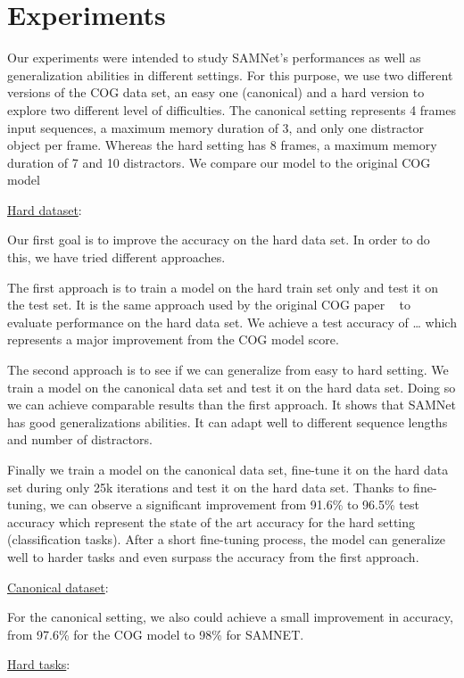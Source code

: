 \section{Experiments}

Our experiments were intended to study SAMNet's performances as well as generalization abilities in different settings. For this purpose, we use two different versions of the COG data set, an easy one (canonical) and a hard version to explore two different level of difficulties. The canonical setting represents 4 frames input sequences, a maximum memory duration of 3, and only one distractor object per frame. Whereas the hard setting has 8 frames, a maximum memory duration of 7 and 10 distractors. We compare our model to the original COG model~\cite{cog2018}

\underline {Hard dataset}:

Our first goal is to improve the accuracy on the hard data set. In order to do this, we have tried different approaches.

The first approach is to train a model on the hard train set only and test it on the test set. It is the same approach used by the original COG paper ~\cite{cog2018} to evaluate performance on the hard data set. We achieve a test accuracy of … which represents a major improvement from the COG model score.

The second approach is to see if we can generalize from easy to hard setting. We train a model on the canonical data set and test it on the hard data set. Doing so we can achieve comparable results than the first approach. It shows that SAMNet has good generalizations abilities. It can adapt well to different sequence lengths and number of distractors.

Finally we train a model on the canonical data set, fine-tune it on the hard data set during only 25k iterations and test it on the hard data set. Thanks to fine-tuning, we can observe a significant improvement from 91.6\%  to 96.5\% test accuracy which represent the state of the art accuracy for the hard setting (classification tasks).
After a short fine-tuning process, the model can generalize well to harder tasks and even surpass the accuracy from the first approach.

\underline {Canonical dataset}:

For the canonical setting, we also could achieve a small improvement in accuracy, from 97.6\% for the COG model to 98\% for SAMNET.

\underline {Hard tasks}:

